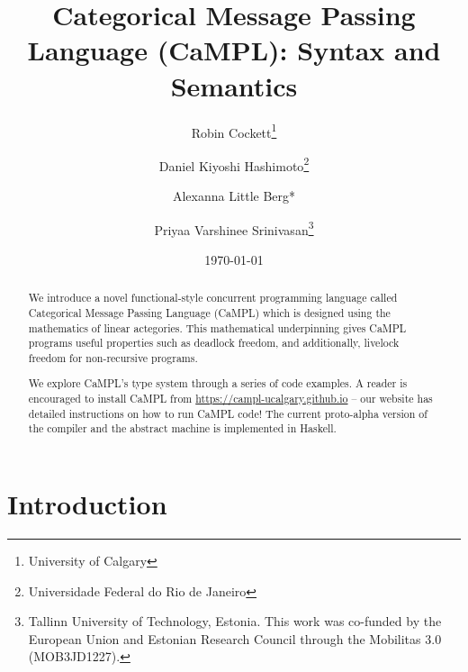 \documentclass[11pt]{article}
\title{Categorical Message Passing Language (CaMPL): \newline Syntax and Semantics}
\author{
    Robin Cockett\thanks{University of Calgary} \and Daniel Kiyoshi Hashimoto\thanks{Universidade Federal do Rio de Janeiro} \and Alexanna {Little Berg}* \and Priyaa Varshinee Srinivasan\thanks{Tallinn University of Technology, Estonia. This work was co-funded by the European Union and Estonian Research Council through the Mobilitas 3.0
(MOB3JD1227).}}
\date{\today}
\begin{document}
\maketitle

\begin{abstract}
We introduce a novel functional-style concurrent programming language called Categorical Message Passing Language (CaMPL) which is designed using the mathematics of linear actegories. 
This mathematical underpinning gives CaMPL programs useful properties such as deadlock freedom, and additionally, livelock freedom for non-recursive programs.

We explore CaMPL's type system through a series of code examples. 
A reader is encouraged to install CaMPL from \url{https://campl-ucalgary.github.io} -- our website has detailed instructions on how to run CaMPL code!
The current proto-alpha version of the compiler and the abstract machine is implemented in Haskell. 
\end{abstract}

\tableofcontents

\section{Introduction}
%
%
\end{document}
